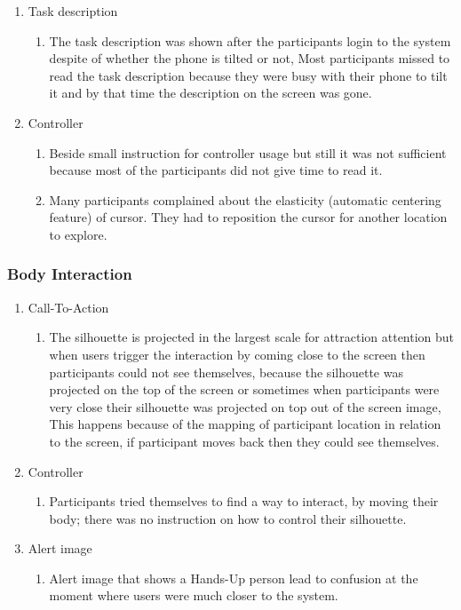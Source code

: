 \begin{enumerate}
\item	Task description
\begin{enumerate}
\item	The task description was shown after the participants login to the system despite of whether the phone is tilted or not, Most participants missed to read the task description because they were busy with their phone to tilt it and by that time the description on the screen was gone.
\end{enumerate}

\item	Controller
\begin{enumerate}
\item	Beside small instruction for controller usage but still it was not sufficient because most of the participants did not give time to read it.	
\item	Many participants complained about the elasticity (automatic centering feature) of cursor. They had to reposition the cursor for another location to explore.
\end{enumerate}
\end{enumerate}

\subsubsection {Body Interaction}

\begin{enumerate}
\item	Call-To-Action
\begin{enumerate}
\item	The silhouette is projected in the largest scale for attraction attention but when users trigger the interaction by coming close to the screen then participants could not see themselves, because the silhouette was projected on the top of the screen or sometimes when participants were very close their silhouette was projected on top out of the screen image, This happens because of the mapping of participant location in relation to the screen, if participant moves back then they could see themselves. 
\end{enumerate}

\item	Controller
\begin{enumerate}
\item	Participants tried themselves to find a way to interact, by moving their body; there was no instruction on how to control their silhouette.
\end{enumerate}

\item	Alert image
\begin{enumerate}
\item	Alert image that shows a Hands-Up person lead to confusion at the moment where users were much closer to the system.
\end{enumerate}
\end{enumerate}


